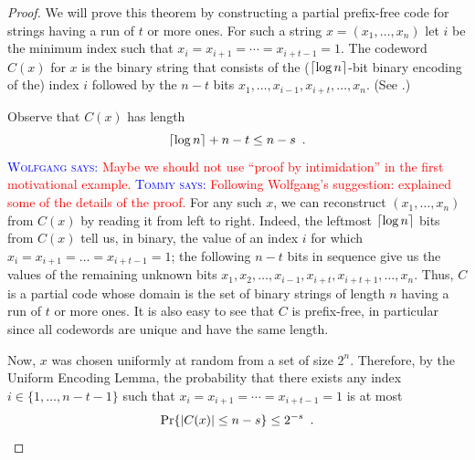 \documentclass{patmorin}
\newcommand{\aremark}[3]{\textcolor{blue}{\textsc{#1 #2:}}
  \textcolor{red}{\textsf{#3}}}
\newcommand{\tommy}[2][says]{\aremark{Tommy}{#1}{#2}}
\newcommand{\wolfgang}[2][says]{\aremark{Wolfgang}{#1}{#2}}
\begin{document}
\begin{proof}
  We will prove this theorem by constructing a partial prefix-free
  code for strings having a run of $t$ or more ones.  For such a
  string $x=(x_1,\ldots,x_n)$ let $i$ be the minimum index such that
  $x_i=x_{i+1}=\cdots=x_{i+t-1}=1$. The codeword $C(x)$ for $x$ is the
  binary string that consists of the (${\lceil \log n \rceil}$-bit binary
  encoding of the) index $i$ followed by the $n-t$ bits
  $x_1,\ldots,x_{i-1},x_{i+t},\ldots,x_n$. (See .)

  Observe that $C(x)$ has length 
  \[
    {\lceil \log n \rceil} + n - t \le n-s \enspace .
  \]
  \wolfgang{Maybe we should not use ``proof by intimidation'' in the
    first motivational example.}  \tommy{Following Wolfgang's
    suggestion: explained some of the details of the proof.}  For any
  such $x$, we can reconstruct $(x_1,\ldots,x_n)$ from $C(x)$ by
  reading it from left to right. Indeed, the leftmost ${\lceil \log n \rceil}$
  bits from $C(x)$ tell us, in binary, the value of an index $i$ for
  which $x_i = x_{i + 1} = \dots = x_{i + t - 1} = 1$; the following
  $n - t$ bits in sequence give us the values of the remaining unknown
  bits
  $x_1, x_2, \dots, x_{i - 1}, x_{i + t}, x_{i + t + 1}, \dots,
  x_n$. Thus, $C$ is a partial code whose domain is the set of binary
  strings of length $n$ having a run of $t$ or more ones.  It is also
  easy to see that $C$ is prefix-free, in particular since all
  codewords are unique and have the same length.

  Now, $x$ was chosen uniformly at random from a set of size $2^{n}$.
  Therefore, by the Uniform Encoding Lemma, the probability that there
  exists any index $i\in\{1,\ldots,n-t-1\}$ such that
  $x_i=x_{i+1}=\cdots=x_{i+t-1}=1$ is at most
  \[
    \Pr\{|C(x)|\le n-s\} \le 2^{-s} \enspace . \qedhere 
  \]
\end{proof}
\end{document}
